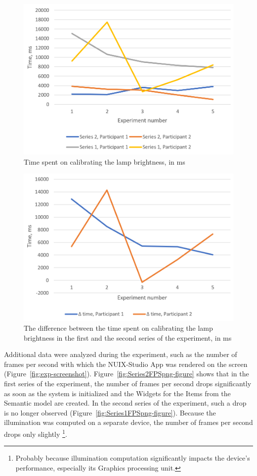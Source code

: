\begin{figure}
  \centering
  \includegraphics[width = 0.9 \linewidth]{figures/ExperimentTime.png}
  \caption{Time spent on calibrating the lamp brightness, in ms}
  \label{fig:ExperimentTime-figure}
\end{figure}


\begin{figure}
  \centering
  \includegraphics[width = 0.9 \linewidth]{figures/DeltaTime.png}
  \caption{The difference between the time spent on calibrating the lamp brightness in the first and the second series of the experiment, in ms}
  \label{fig:DeltaTime-figure}
\end{figure}

Additional data were analyzed during the experiment, such as the number of frames per second with which the NUIX-Studio App was rendered on the screen (Figure~\ref{fig:exp-screenshot}). Figure~\ref{fig:Series2FPSpng-figure} shows that in the first series of the experiment, the number of frames per second drops significantly as soon as the system is initialized and the Widgets for the Items from the Semantic model are created. In the second series of the experiment, such a drop is no longer observed (Figure~\ref{fig:Series1FPSpng-figure}). Because the illumination was computed on a separate device, the number of frames per second drops only slightly \footnote{Probably because illumination computation significantly impacts the device's performance, especially its Graphics processing unit.}.

